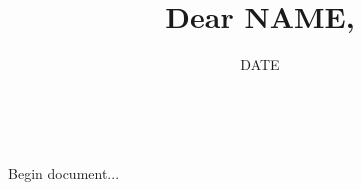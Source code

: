 \documentclass[a4paper, 11pt]{article} %
\title{\textbf{Dear NAME,}} %
\author{DATE} %
\date{} %
\makeatletter
\renewcommand{\maketitle}{ %
\begin{flushright}
{\large\@author} %
\\\@date %
\end{flushright}

\begin{flushleft} %
{\Large\@title} %
\end{flushleft}
}
\makeatother
\begin{document}
\maketitle %



\vspace{0pt} %

\noindent Begin document...
\end{document}
